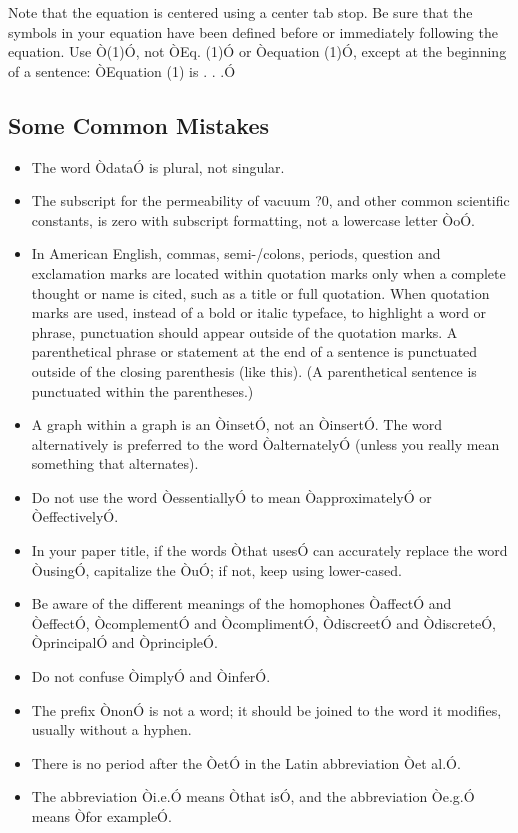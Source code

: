 \documentclass[letterpaper, 10 pt, conference]{ieeeconf}  %
\begin{document}
Note that the equation is centered using a center tab stop. Be sure that the symbols in your equation have been defined before or immediately following the equation. Use Ò(1)Ó, not ÒEq. (1)Ó or Òequation (1)Ó, except at the beginning of a sentence: ÒEquation (1) is . . .Ó

\subsection{Some Common Mistakes}
\begin{itemize}


\item The word ÒdataÓ is plural, not singular. \cite{Leo}
\item The subscript for the permeability of vacuum ?0, and other common scientific constants, is zero with subscript formatting, not a lowercase letter ÒoÓ.
\item In American English, commas, semi-/colons, periods, question and exclamation marks are located within quotation marks only when a complete thought or name is cited, such as a title or full quotation. When quotation marks are used, instead of a bold or italic typeface, to highlight a word or phrase, punctuation should appear outside of the quotation marks. A parenthetical phrase or statement at the end of a sentence is punctuated outside of the closing parenthesis (like this). (A parenthetical sentence is punctuated within the parentheses.)
\item A graph within a graph is an ÒinsetÓ, not an ÒinsertÓ. The word alternatively is preferred to the word ÒalternatelyÓ (unless you really mean something that alternates).
\item Do not use the word ÒessentiallyÓ to mean ÒapproximatelyÓ or ÒeffectivelyÓ.
\item In your paper title, if the words Òthat usesÓ can accurately replace the word ÒusingÓ, capitalize the ÒuÓ; if not, keep using lower-cased.
\item Be aware of the different meanings of the homophones ÒaffectÓ and ÒeffectÓ, ÒcomplementÓ and ÒcomplimentÓ, ÒdiscreetÓ and ÒdiscreteÓ, ÒprincipalÓ and ÒprincipleÓ.
\item Do not confuse ÒimplyÓ and ÒinferÓ.
\item The prefix ÒnonÓ is not a word; it should be joined to the word it modifies, usually without a hyphen.
\item There is no period after the ÒetÓ in the Latin abbreviation Òet al.Ó.
\item The abbreviation Òi.e.Ó means Òthat isÓ, and the abbreviation Òe.g.Ó means Òfor exampleÓ.

\end{itemize}
\end{document}
